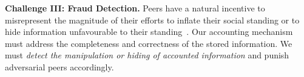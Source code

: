 \textbf{Challenge III: Fraud Detection.}
Peers have a natural incentive to misrepresent the magnitude of their efforts to inflate their social standing or to hide information unfavourable to their standing~\cite{meulpolder2009bartercast}.
Our accounting mechanism must address the completeness and correctness of the stored information.
We must \emph{detect the manipulation or hiding of accounted information} and punish adversarial peers accordingly.





